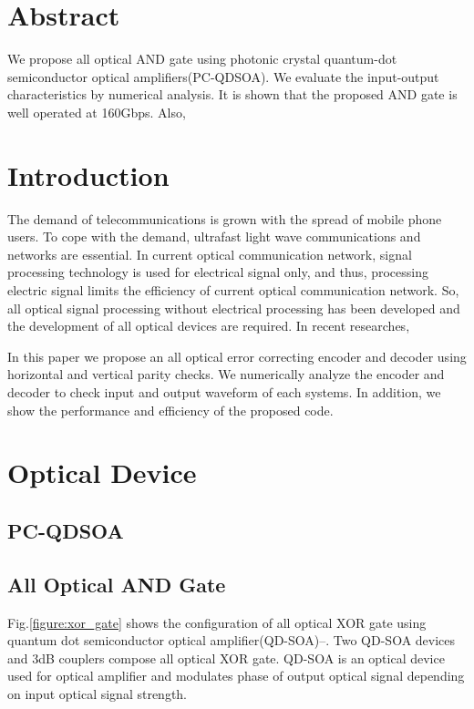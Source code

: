 \documentclass[twocolumn,a4paper]{article}
\begin{document}
\section*{Abstract}

We propose all optical AND gate using photonic crystal quantum-dot semiconductor optical amplifiers(PC-QDSOA). We evaluate the input-output characteristics by numerical analysis. It is shown that the proposed AND gate is well operated at 160Gbps. Also, 

\section{Introduction}
The demand of telecommunications is grown with the spread of mobile phone users. To cope with the demand, ultrafast light wave communications and networks are essential. In current optical communication network, signal processing technology is used for electrical signal only, and thus, processing electric signal limits the efficiency of current optical communication network{\cite{App}}. So, all optical signal processing  without electrical processing has been developed and the development of all optical devices are required. In recent researches, 

In this paper we propose an all optical error correcting encoder and decoder using horizontal and vertical parity checks. We numerically analyze the encoder and decoder to check input and output waveform of each systems. In addition, we show the performance and efficiency of the proposed code.

\section{Optical Device}
\subsection{PC-QDSOA}


\subsection{All Optical AND Gate}
Fig.{\ref{figure:xor_gate}} shows the configuration of all optical XOR gate using quantum dot semiconductor optical amplifier(QD-SOA){\cite{Omar}}--{\cite{Ultrafast}}. Two QD-SOA devices and 3dB couplers compose all optical XOR gate. QD-SOA is an optical device used for optical amplifier and modulates phase of output optical signal depending on input optical signal strength.
\end{document}
